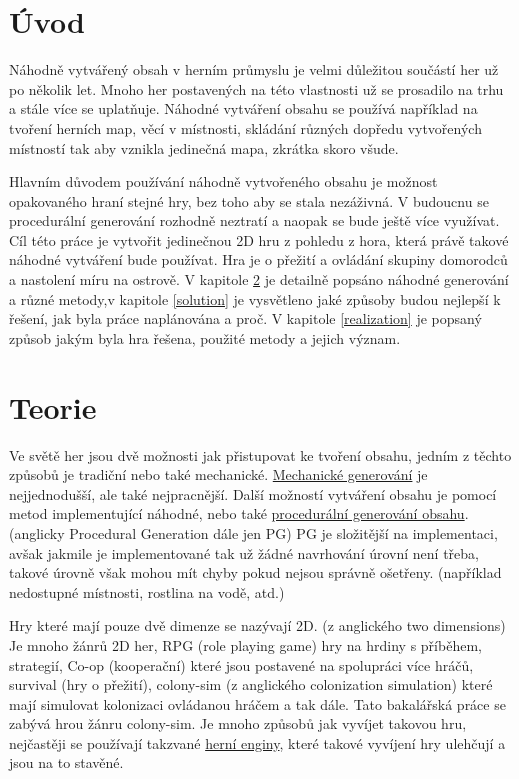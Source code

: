 
\chapter{Úvod}
Náhodně vytvářený obsah v herním průmyslu je velmi důležitou součástí her už po několik let. Mnoho her postavených na této vlastnosti už se prosadilo na trhu a stále více se uplatňuje. Náhodné vytváření obsahu se používá například na tvoření herních map, věcí v místnosti, skládání různých dopředu vytvořených místností tak aby vznikla jedinečná mapa, zkrátka skoro všude. 

Hlavním důvodem používání náhodně vytvořeného obsahu je možnost opakovaného hraní stejné hry, bez toho aby se stala nezáživná. V budoucnu se procedurální generování rozhodně neztratí a naopak se bude ještě více využívat. Cíl této práce je vytvořit jedinečnou 2D hru z pohledu z hora, která právě takové náhodné vytváření bude používat. Hra je o přežití a ovládání skupiny domorodců a nastolení míru na ostrově. V kapitole \ref{Teorie} je detailně popsáno náhodné generování a různé metody,v kapitole \ref{solution} je vysvětleno jaké způsoby budou nejlepší k řešení, jak byla práce naplánována a proč. V kapitole \ref{realization} je popsaný způsob jakým byla hra řešena, použité metody a jejich význam.

\chapter{Teorie} 
\label{Teorie}
Ve světě her jsou dvě možnosti jak přistupovat ke tvoření obsahu, jedním z těchto způsobů je tradiční nebo také mechanické. \hyperref[traditional]{Mechanické generování} je nejjednodušší, ale také nejpracnější. Další možností vytváření obsahu je pomocí metod implementující náhodné, nebo také \hyperref[procedural]{procedurální generování obsahu}. (anglicky Procedural Generation dále jen PG) PG je složitější na implementaci, avšak jakmile je implementované tak už žádné navrhování úrovní není třeba, takové úrovně však mohou mít chyby pokud nejsou správně ošetřeny. (například nedostupné místnosti, rostlina na vodě, atd.)

Hry které mají pouze dvě dimenze se nazývají 2D. (z anglického two dimensions) Je mnoho žánrů 2D her, RPG (role playing game) hry na hrdiny s příběhem, strategií, Co-op (kooperační) které jsou postavené na spolupráci více hráčů, survival (hry o přežití), colony-sim (z anglického colonization simulation) které mají simulovat kolonizaci ovládanou hráčem a tak dále. Tato bakalářská práce se zabývá hrou žánru colony-sim. Je mnoho způsobů jak vyvíjet takovou hru, nejčastěji se používají takzvané \hyperref[enginy]{herní enginy}, které takové vyvíjení hry ulehčují a jsou na to stavěné.



